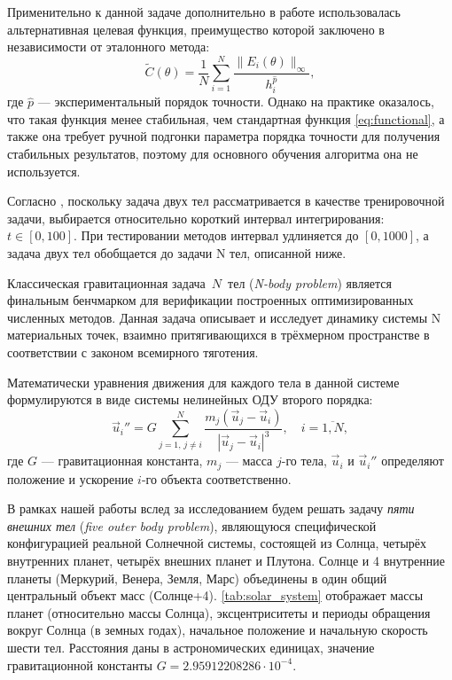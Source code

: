 Применительно к данной задаче дополнительно в работе \cite{Anastassi2025} использовалась альтернативная целевая функция, преимущество которой заключено в независимости от эталонного метода:
\begin{equation}
	\label{eq:alternativе_functional}
	\tilde{C}(\theta) = \frac{1}{N} \sum_{i = 1}^N \frac{\lVert E_i(\theta) \lVert_{\infty}}{h_i^{\hat{p}}},
\end{equation}
где $\hat{p}$ — экспериментальный порядок точности.
Однако на практике оказалось, что такая функция менее стабильная, чем стандартная функция \eqref{eq:functional}, а также она требует ручной подгонки параметра порядка точности для получения стабильных результатов, поэтому для основного обучения алгоритма она не используется.

Согласно \cite{Anastassi2025}, поскольку задача двух тел рассматривается в качестве тренировочной задачи, выбирается относительно короткий интервал интегрирования: $t \in [0, 100]$. При тестировании методов интервал удлиняется до $[0, 1000]$, а задача двух тел обобщается до задачи N тел, описанной ниже.

Классическая гравитационная задача~$N$~тел (\textit{N-body problem}) является финальным бенчмарком для верификации построенных оптимизированных численных методов. Данная задача описывает и исследует динамику системы N материальных точек, взаимно притягивающихся в трёхмерном пространстве в соответствии с законом всемирного тяготения.

Математически уравнения движения для каждого тела в данной системе формулируются в виде системы нелинейных ОДУ второго порядка:
\begin{equation} \label{eq:n_body}
	\vec{u}_i'' = G \sum_{j=1, \, j \neq i}^{N} \frac{m_j (\vec{u}_j - \vec{u}_i)}{|\vec{u}_j - \vec{u}_i|^3}, \quad i = \overline{1, N},
\end{equation}
где $G$ — гравитационная константа, $m_j$ — масса $j$-го тела, $\vec{u}_i$ и $\vec{u}_i''$ определяют положение и ускорение $i$-го объекта соответственно.

В рамках нашей работы вслед за исследованием \cite{Anastassi2025} будем решать задачу \textit{пяти внешних тел} (\textit{five outer body problem}), являющуюся специфической конфигурацией реальной Солнечной системы, состоящей из Солнца, четырёх внутренних планет, четырёх внешних планет и Плутона. Солнце и 4 внутренние планеты (Меркурий, Венера, Земля, Марс) объединены в один общий центральный объект масс (Солнце+4). \autoref{tab:solar_system} отображает массы планет (относительно массы Солнца), эксцентриситеты и периоды обращения вокруг Солнца (в земных годах), начальное положение и начальную скорость шести тел. Расстояния даны в астрономических единицах, значение гравитационной константы $G = 2.95912208286 \cdot 10^{-4}$. 

